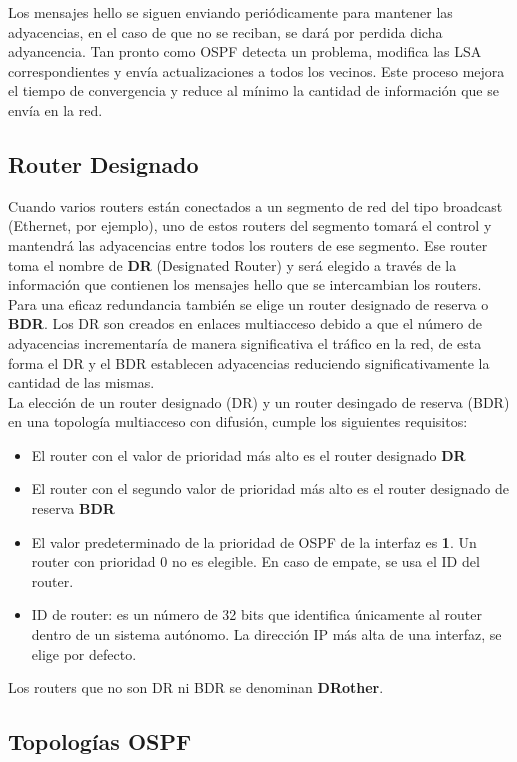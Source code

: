 \documentclass[12pt]{article}
\begin{document}
Los mensajes hello se siguen enviando periódicamente para mantener las adyacencias, en el caso de que no se reciban, se dará por perdida dicha adyancencia. Tan pronto como OSPF detecta un problema, modifica las LSA correspondientes y envía actualizaciones a todos los vecinos. Este proceso mejora el tiempo de convergencia y reduce al mínimo la cantidad de información que se envía en la red.

\subsection{Router Designado}
Cuando varios routers están conectados a un segmento de red del tipo broadcast (Ethernet, por ejemplo), uno de estos routers del segmento tomará el control y mantendrá las adyacencias entre todos los routers de ese segmento. Ese router toma el nombre de \textbf{DR} (Designated Router) y será elegido a través de la información que contienen los mensajes hello que se intercambian los routers. Para una eficaz redundancia también se elige un router designado de reserva o \textbf{BDR}. Los DR son creados en enlaces multiacceso debido a que el número de adyacencias incrementaría de manera significativa el tráfico en la red, de esta forma el DR y el BDR establecen adyacencias reduciendo significativamente la cantidad de las mismas.\\

La elección de un router designado (DR) y un router desingado de reserva (BDR) en una topología multiacceso con difusión, cumple los siguientes requisitos:
\begin{itemize}
\item El router con el valor de prioridad más alto es el router designado \textbf{DR}
\item El router con el segundo valor de prioridad más alto es el router designado de reserva \textbf{BDR}
\item El valor predeterminado de la prioridad de OSPF de la interfaz es \textbf{1}. Un router con prioridad 0 no es elegible. En caso de empate, se usa el ID del router.
\item ID de router: es un número de 32 bits que identifica únicamente al router dentro de un sistema autónomo. La dirección IP más alta de una interfaz, se elige por defecto.
\end{itemize}

Los routers que no son DR ni BDR se denominan \textbf{DRother}.

\subsection{Topologías OSPF}
\end{document}
